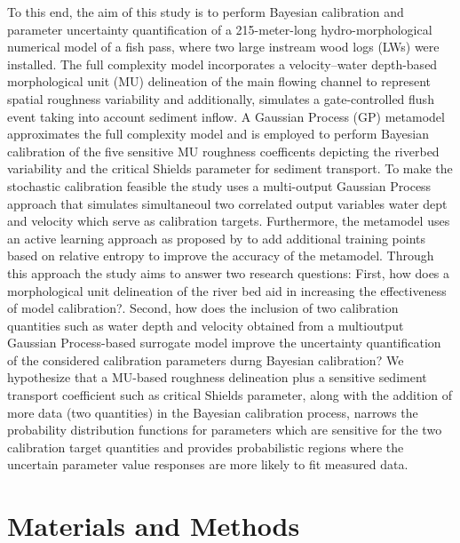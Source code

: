 \documentclass[draft,linenumbers,onecolumn]{agujournal2019} %
\begin{document}
% 
To this end, the aim of this study is to perform Bayesian calibration and parameter uncertainty quantification of a 215-meter-long hydro-morphological numerical model of a fish pass, where two large instream wood logs (LWs) were installed. The full complexity model incorporates a velocity–water depth-based morphological unit (MU) delineation of the main flowing channel to represent spatial roughness variability and additionally, simulates a gate-controlled flush event taking into account sediment inflow. A Gaussian Process (GP) metamodel approximates the full complexity model and is employed to perform Bayesian calibration of the five sensitive MU roughness coefficents depicting the riverbed variability and the critical Shields parameter for sediment transport. To make the stochastic calibration feasible the study uses a multi-output Gaussian Process approach that simulates simultaneoul two correlated output variables water dept and velocity which serve as calibration targets. Furthermore, the metamodel uses an active learning approach as proposed by \cite{oladyshkin2020bayesian3} to add additional training points based on relative entropy to improve the accuracy of the metamodel. Through this approach the study aims to answer two research questions: First, how does a morphological unit delineation of the river bed aid in increasing the effectiveness of model calibration?. Second, how does the inclusion of two calibration quantities such as water depth and velocity obtained from a multioutput Gaussian Process-based surrogate model improve the uncertainty quantification of the considered calibration parameters durng Bayesian calibration? We hypothesize that a MU-based roughness delineation plus a sensitive sediment transport coefficient such as critical Shields parameter, along with the addition of more data (two quantities) in the Bayesian calibration process, narrows the probability distribution functions for parameters which are sensitive for the two calibration target quantities and provides probabilistic regions where the uncertain parameter value responses are more likely to fit measured data.  


\section{Materials and Methods} 
\label{Materials}
\cite{haag2001erosion}
\end{document}
